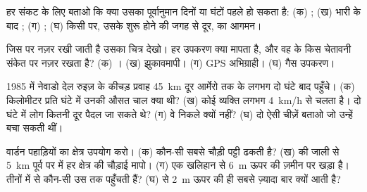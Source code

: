 \begin{exercise}[$\star$]\label{exo:g9:natural-risks:3}
हर संकट के लिए बताओ कि क्या उसका पूर्वानुमान दिनों या घंटों पहले हो सकता है: (क) ;
(ख) भारी  के बाद ; (ग) ; (घ) किसी  पर, उसके शुरू होने की जगह से दूर,
 का आगमन।
\end{exercise}

\begin{exercise}[$\star$]\label{exo:g9:natural-risks:4}
जिस  पर नज़र रखी जाती है उसका चित्र देखो। हर उपकरण क्या मापता है, और वह 
के किस चेतावनी संकेत पर नज़र रखता है? (क) । (ख) झुकावमापी। (ग) GPS अभिग्राही।
(घ) गैस उपकरण।
\end{exercise}

\begin{exercise}[$\star\star$]\label{exo:g9:natural-risks:5}
1985 में नेवाडो देल रुइज़ के कीचड़ प्रवाह \qty{45}{km} दूर आर्मेरो तक  के लगभग
दो घंटे बाद पहुँचे। (क) किलोमीटर प्रति घंटे में उनकी औसत चाल क्या थी? (ख) कोई व्यक्ति
लगभग \qty{4}{km/h} से चलता है। दो घंटे में लोग कितनी दूर पैदल जा सकते थे? (ग) वे
निकले क्यों नहीं? (घ) दो ऐसी चीज़ें बताओ जो उन्हें बचा सकती
थीं।
\end{exercise}

\begin{exercise}[$\star\star$]\label{exo:g9:natural-risks:6}
वार्डन पहाड़ियों का  क्षेत्र  उपयोग करो। (क) कौन-सी  सबसे चौड़ी पट्टी ढकती
है? (ख)  की जाली से \qty{5}{km} पूर्व पर  में हर क्षेत्र की चौड़ाई
मापो। (ग) एक खलिहान  से \qty{6}{m} ऊपर की ज़मीन पर खड़ा है। तीनों में से कौन-सी
 उस तक पहुँचती हैं? (घ)  से \qty{2}{m} ऊपर की  ही सबसे ज़्यादा बार क्यों
आती
है?
\end{exercise}

